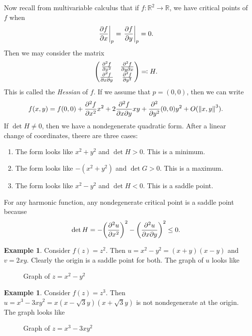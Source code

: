 \documentclass[leqno, openany]{memoir}
\theoremstyle{definition}
\newtheorem{exm}[thm]{Example}
\theoremstyle{remark}
\theoremstyle{plain}
\theoremstyle{definition}
\theoremstyle{remark}
\newcommand{\R}{\mathbb{R}}
\begin{document}
Now recall from multivariable calculus that if $f \colon \R^2 \to \R$, we have
critical points of $f$ when \[ \eval{ \pdv{f}{x} }_p = \eval{\pdv{f}{y}}_p = 0.
    \] Then we may consider the matrix \[ \mqty( \pdv[2]{f}{x} & \pdv{f}{y}{x}
\\ \pdv{f}{x}{y} & \pdv[2]{f}{y} ) \eqqcolon H. \] This is called the
\textit{Hessian} of $f$. If we assume that $p = (0,0)$, then we can write \[
f(x,y) = f(0,0) + \pdv[2]{f}{x}(0,0) x^2 + 2 \pdv{f}{x}{y} (0,0) xy +
\pdv[2]{y}(0,0) y^2 + O(\norm{x,y}^3). \] If $\det H \neq 0$, then we have a
nondegenerate quadratic form. After a linear change of coordinates, theere are
three cases: \begin{enumerate} \item The form looks like $x^2 + y^2$ and $\det
    H > 0$. This is a minimum.  \item The form looks like $-(x^2 + y^2)$ and
    $\det G > 0$. This is a maximum.  \item The form looks like $x^2 - y^2$ and
    $\det H < 0$. This is a saddle point.  \end{enumerate} For any harmonic
    function, any nondegenerate critical point is a saddle point because \[
        \det H = - {\qty(\pdv[2]{u}{x})}^2 - {\qty(\pdv{u}{x}{y})}^2 \leq 0. \]
        \begin{exm} Consider $f(z) = z^2$. Then $u = x^2 - y^2 = (x+y)(x-y)$
            and $v = 2xy$. Clearly the origin is a saddle point for both. The
            graph of $u$ looks like \begin{figure}[H] \begin{center}
                 \end{center} \caption{Graph of
                    $z = x^2 - y^2$}%
                \end{figure} \end{exm}

\begin{exm} Consider $f(z) = z^3$. Then $u = x^3 - 3xy^2 =
    x(x-\sqrt{3}y)(x+\sqrt{3}y)$ is not nondegenerate at the origin. The graph
    looks like \begin{figure}[H] \begin{center}  \end{center} \caption{Graph
        of $z = x^3 - 3xy^2$}%
    \end{figure} \end{exm}
\end{document}
